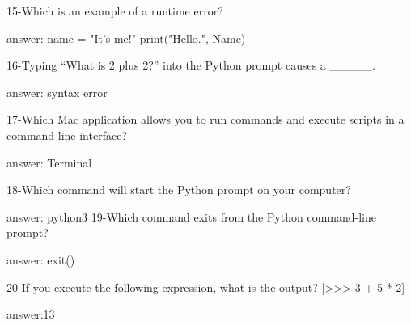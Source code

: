 15-Which is an example of a runtime error?

answer: name = "It's me!"
        print("Hello.", Name)

16-Typing “What is 2 plus 2?” into the Python prompt causes a _____.

answer: syntax error

17-Which Mac application allows you to run commands and execute scripts in a command-line interface?

answer: Terminal

18-Which command will start the Python prompt on your computer?

answer: python3
19-Which command exits from the Python command-line prompt?

answer: exit()

20-If you execute the following expression, what is the output? [>>> 3 + 5 * 2]

answer:13
